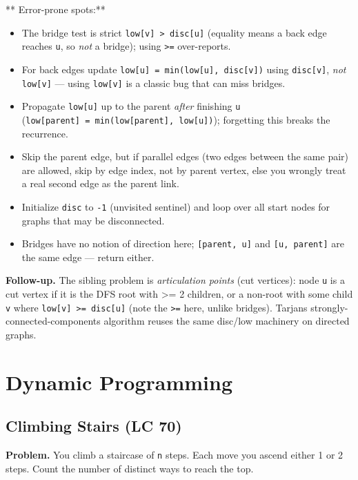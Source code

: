 \documentclass[11pt]{article}
\providecommand{\tightlist}{\setlength{\itemsep}{1pt}\setlength{\parskip}{0pt}}
\begin{document}
** Error-prone spots:**

\begin{itemize}
\tightlist
\item
  The bridge test is strict \texttt{low{[}v{]}\ \textgreater{}\ disc{[}u{]}} (equality means a back edge reaches \texttt{u}, so \emph{not} a bridge); using \texttt{\textgreater{}=} over-reports.
\item
  For back edges update \texttt{low{[}u{]}\ =\ min(low{[}u{]},\ disc{[}v{]})} using \texttt{disc{[}v{]}}, \emph{not} \texttt{low{[}v{]}} --- using \texttt{low{[}v{]}} is a classic bug that can miss bridges.
\item
  Propagate \texttt{low{[}u{]}} up to the parent \emph{after} finishing \texttt{u} (\texttt{low{[}parent{]}\ =\ min(low{[}parent{]},\ low{[}u{]})}); forgetting this breaks the recurrence.
\item
  Skip the parent edge, but if parallel edges (two edges between the same pair) are allowed, skip by edge index, not by parent vertex, else you wrongly treat a real second edge as the parent link.
\item
  Initialize \texttt{disc} to \texttt{-1} (unvisited sentinel) and loop over all start nodes for graphs that may be disconnected.
\item
  Bridges have no notion of direction here; \texttt{{[}parent,\ u{]}} and \texttt{{[}u,\ parent{]}} are the same edge --- return either.
\end{itemize}

\textbf{Follow-up.} The sibling problem is \emph{articulation points} (cut vertices): node \texttt{u} is a cut vertex if it is the DFS root with \textgreater= 2 children, or a non-root with some child \texttt{v} where \texttt{low{[}v{]}\ \textgreater{}=\ disc{[}u{]}} (note the \texttt{\textgreater{}=} here, unlike bridges). Tarjan\textquotesingle s strongly-connected-components algorithm reuses the same disc/low machinery on directed graphs.

\section{Dynamic Programming}\label{dynamic-programming}

\subsection{Climbing Stairs (LC 70)}\label{climbing-stairs-lc-70}

\textbf{Problem.} You climb a staircase of \texttt{n} steps. Each move you ascend either 1 or 2 steps. Count the number of distinct ways to reach the top.
\end{document}
